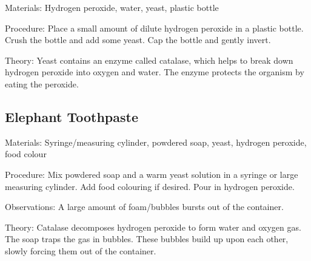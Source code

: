 \begin{multicols}{2}

\begin{description*}
\item[Materials:]{Hydrogen peroxide, water, yeast, plastic bottle}
\item[Procedure:]{Place a small amount of dilute hydrogen peroxide in a plastic bottle. Crush the bottle and add some yeast. Cap the bottle and gently invert.}
\item[Theory:]{Yeast contains an enzyme called catalase, which helps to break down hydrogen peroxide into oxygen and water. The enzyme protects the organism by eating the peroxide.}
\end{description*}

\subsection{Elephant Toothpaste} %


\begin{description*}
\item[Materials:]{Syringe/measuring cylinder, powdered soap, yeast, hydrogen peroxide, food colour}
\item[Procedure:]{Mix powdered soap and a warm yeast solution in a syringe or large measuring cylinder. Add food colouring if desired. Pour in hydrogen peroxide.}
\item[Observations:]{A large amount of foam/bubbles bursts out of the container.}
\item[Theory:]{Catalase decomposes hydrogen peroxide to form water and oxygen
gas. The soap
traps the gas in bubbles. These bubbles build up upon each other, slowly
forcing them out of the container. }
\end{description*}


\end{multicols}
